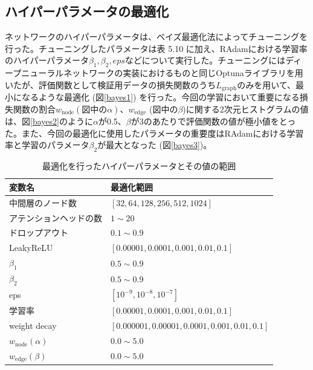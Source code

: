\subsection{ハイパーパラメータの最適化}
ネットワークのハイパーパラメータは、ベイズ最適化法によってチューニングを行った。チューニングしたパラメータは表 5.10%
に加え、RAdamにおける学習率のハイパーパラメータ$\beta_1, \beta_2, eps$などについて実行した。チューニングにはディープニューラルネットワークの実装におけるものと同じOptunaライブラリを用いたが、評価関数として検証用データの損失関数のうち$ L_\mathrm{{graph}}$のみを用いて、最小になるような最適化 (図\ref{bayes1}) を行った。今回の学習において重要になる損失関数の割合$w_{\mathrm{node}} (図中の\alpha)$、$w_{\mathrm{edge}}$ (図中の$\beta$)に関する2次元ヒストグラムの値は、図\ref{bayes2}のように$\alpha$が0.5、$\beta$が3のあたりで評価関数の値が極小値をとった。また、今回の最適化に使用したパラメータの重要度はRAdamにおける学習率と学習のパラメータ$\beta_2$が最大となった (図\ref{bayes3})。
\begin{table}[H]
\centering
 \begin{tabular}{ l  l }
 \hline
 変数名 & 最適化範囲\\
 \hline
 \hline
 中間層のノード数 & $[32, 64, 128, 256, 512, 1024]$\\
 アテンションヘッドの数 & $1 \sim 20$\\
 ドロップアウト & $0.1 \sim 0.9$\\
 LeakyReLU & $[0.00001, 0.0001, 0.001, 0.01, 0.1]$\\
 $\beta_1$ & $0.5 \sim 0.9$\\ 
 $\beta_2$ & $0.5 \sim 0.9$\\ 
 eps & $[10^{-9}, 10^{-8}, 10^{-7}]$\\
 学習率 & $[0.00001, 0.0001, 0.001, 0.01, 0.1]$\\
 weight decay & $[0.000001, 0.00001, 0.0001, 0.001, 0.01, 0.1]$\\
 $w_{\mathrm{node}}(\alpha)$ & $0.0 \sim 5.0$\\
 $w_{\mathrm{edge}}(\beta)$ & $0.0 \sim 5.0$\\
  \hline
 \end{tabular}
 \label{gnnoptuna}
 \caption{最適化を行ったハイパーパラメータとその値の範囲}
\end{table}

